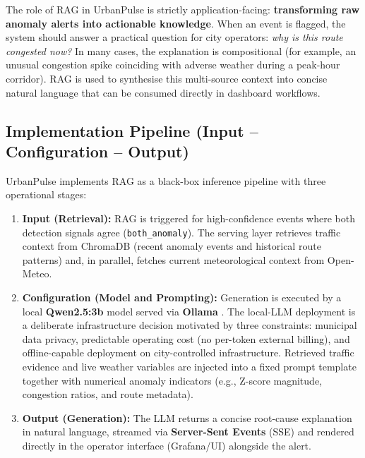     The role of RAG in UrbanPulse is strictly application-facing:
    \textbf{transforming raw anomaly alerts into actionable knowledge}.
    When an event is flagged, the system should answer a practical
    question for city operators: \textit{why is this route congested now?}
    In many cases, the explanation is compositional (for example, an
    unusual congestion spike coinciding with adverse weather during a
    peak-hour corridor). RAG is used to synthesise this multi-source
    context into concise natural language that can be consumed directly in
    dashboard workflows.

    \subsection{Implementation Pipeline (Input -- Configuration -- Output)}
    \label{subsec:rag_indexing}

    UrbanPulse implements RAG as a black-box inference pipeline with three
    operational stages:

    \begin{enumerate}
      \item \textbf{Input (Retrieval):} RAG is triggered for
      high-confidence events where both detection signals agree
      (\texttt{both\_anomaly}). The serving layer retrieves traffic
      context from ChromaDB (recent anomaly events and historical route
      patterns) and, in parallel, fetches current meteorological context
      from Open-Meteo.

      \item \textbf{Configuration (Model and Prompting):} Generation is
      executed by a local \textbf{Qwen2.5:3b} model served via
      \textbf{Ollama} \cite{qwen25_report,ollama_docs}. The local-LLM
      deployment is a deliberate infrastructure decision motivated by
      three constraints: municipal data privacy, predictable operating
      cost (no per-token external billing), and offline-capable
      deployment on city-controlled infrastructure. Retrieved traffic
      evidence and live weather variables are injected into a fixed prompt
      template together with numerical anomaly indicators
      (e.g., Z-score magnitude, congestion ratios, and route metadata).

      \item \textbf{Output (Generation):} The LLM returns a concise
      root-cause explanation in natural language, streamed via
      \textbf{Server-Sent Events} (SSE) \cite{sse_spec} and rendered
      directly in the operator interface (Grafana/UI) alongside the alert.
    \end{enumerate}

